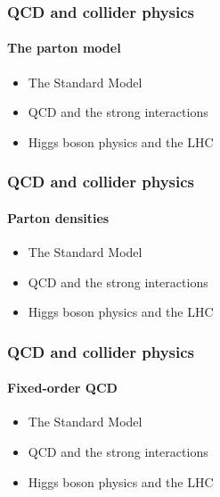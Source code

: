 \documentclass[aspectratio=43]{beamer}
\begin{document}
\begin{frame}
	
	\frametitle{QCD and collider physics}
	\framesubtitle{The parton model}
	
	\begin{itemize}
		\item \footnotesize The Standard Model
		\item \footnotesize QCD and the strong interactions
		\item \footnotesize Higgs boson physics and the LHC
	\end{itemize}

\end{frame}

\begin{frame}
	
	\frametitle{QCD and collider physics}
	\framesubtitle{Parton densities}
	
	\begin{itemize}
		\item \footnotesize The Standard Model
		\item \footnotesize QCD and the strong interactions
		\item \footnotesize Higgs boson physics and the LHC
	\end{itemize}

\end{frame}

\begin{frame}
	
	\frametitle{QCD and collider physics}
	\framesubtitle{Fixed-order QCD}
	
	\begin{itemize}
		\item \footnotesize The Standard Model
		\item \footnotesize QCD and the strong interactions
		\item \footnotesize Higgs boson physics and the LHC
	\end{itemize}

\end{frame}
\end{document}
